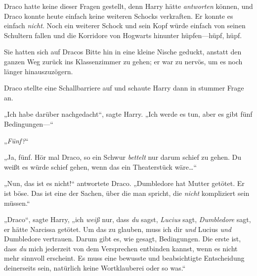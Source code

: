 Draco hatte keine dieser Fragen gestellt, denn Harry hätte \emph{antworten} können, und Draco konnte heute einfach keine weiteren Schocks verkraften. Er konnte es einfach \emph{nicht}. Noch ein weiterer Schock und sein Kopf würde einfach von seinen Schultern fallen und die Korridore von Hogwarts hinunter hüpfen—hüpf, hüpf.

\later

Sie hatten sich auf Dracos Bitte hin in eine kleine Nische geduckt, anstatt den ganzen Weg zurück ins Klassenzimmer zu gehen; er war zu nervös, um es noch länger hinauszuzögern.

Draco stellte eine Schallbarriere auf und schaute Harry dann in stummer Frage an.

„Ich habe darüber nachgedacht“, sagte Harry. „Ich werde es tun, aber es gibt fünf Bedingungen—“

„\emph{Fünf?}“

„Ja, fünf. Hör mal Draco, so ein Schwur \emph{bettelt} nur darum schief zu gehen. Du weißt es würde schief gehen, wenn das ein Theaterstück wäre…“

„Nun, das ist es nicht!“ antwortete Draco. „Dumbledore hat Mutter getötet. Er ist böse. Das ist eine der Sachen, über die man spricht, die \emph{nicht} kompliziert sein müssen.“

„Draco“, sagte Harry, „ich \emph{weiß} nur, dass \emph{du} sagst, \emph{Lucius} sagt, \emph{Dumbledore} sagt, er hätte Narcissa getötet. Um das zu glauben, muss ich dir \emph{und} Lucius \emph{und} Dumbledore vertrauen. Darum gibt es, wie gesagt, Bedingungen. Die erste ist, dass \emph{du} mich jederzeit von dem Versprechen entbinden kannst, wenn es nicht mehr sinnvoll erscheint. Es muss eine bewusste und beabsichtigte Entscheidung deinerseits sein, natürlich keine Wortklauberei oder so was.“

